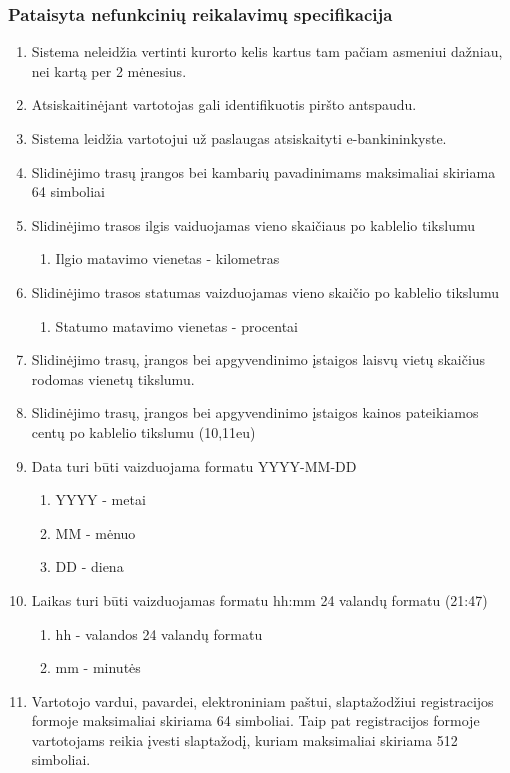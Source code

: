 \documentclass[oneside]{VUMIFPSkursinis}
\begin{document}
\subsubsection{Pataisyta nefunkcinių reikalavimų specifikacija}
\begin{enumerate}

	
	\item Sistema neleidžia vertinti kurorto kelis kartus tam pačiam asmeniui dažniau, nei kartą per 2 mėnesius.

	\item Atsiskaitinėjant vartotojas gali identifikuotis piršto antspaudu.
	\item Sistema leidžia vartotojui už paslaugas atsiskaityti e-bankininkyste.
	\item Slidinėjimo trasų įrangos bei kambarių pavadinimams maksimaliai skiriama 64 simboliai
	\item Slidinėjimo trasos ilgis vaiduojamas vieno skaičiaus po kablelio tikslumu
	\begin{enumerate}
		\item Ilgio matavimo vienetas - kilometras
	\end{enumerate}
	\item Slidinėjimo trasos statumas vaizduojamas vieno skaičio po kablelio tikslumu
	\begin{enumerate}
		\item Statumo matavimo vienetas - procentai
	\end{enumerate}
	\item Slidinėjimo trasų, įrangos bei apgyvendinimo įstaigos laisvų vietų skaičius rodomas vienetų tikslumu.
	\item Slidinėjimo trasų, įrangos bei apgyvendinimo įstaigos kainos pateikiamos centų po kablelio tikslumu (10,11eu)
	\item Data turi būti vaizduojama formatu YYYY-MM-DD
	\begin{enumerate}
		\item YYYY - metai
		\item MM - mėnuo
		\item DD - diena
	\end{enumerate}
	\item Laikas turi būti vaizduojamas formatu hh:mm 24 valandų formatu (21:47)
	\begin{enumerate}
		\item hh - valandos 24 valandų formatu
		\item mm - minutės
	\end{enumerate}
	\item Vartotojo vardui, pavardei, elektroniniam paštui, slaptažodžiui registracijos formoje maksimaliai skiriama 64 simboliai. Taip pat registracijos formoje vartotojams reikia įvesti slaptažodį, kuriam maksimaliai skiriama 512 simboliai.

\end{enumerate}
\end{document}
